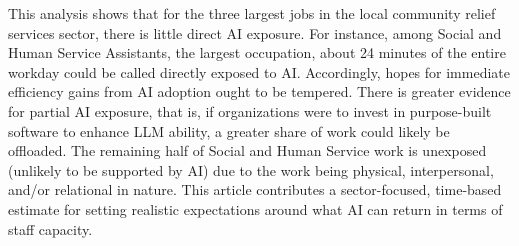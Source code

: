 This analysis shows that for the three largest jobs in the local community relief services sector, there is little direct AI exposure. For instance, among Social and Human Service Assistants, the largest occupation, about 24 minutes of the entire workday could be called directly exposed to AI. Accordingly, hopes for immediate efficiency gains from AI adoption ought to be tempered. There is greater evidence for partial AI exposure, that is, if organizations were to invest in purpose-built software to enhance LLM ability, a greater share of work could likely be offloaded. The remaining half of Social and Human Service work is unexposed (unlikely to be supported by AI) due to the work being physical, interpersonal, and/or relational in nature. This article contributes a sector-focused, time-based estimate for setting realistic expectations around what AI can return in terms of staff capacity.
